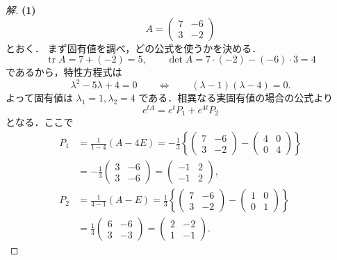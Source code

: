 \documentclass[article,paper=a4paper]{jlreq}
\begin{document}
\begin{proof}[解]
\textbf{(1)}
\[
  A=
  \begin{pmatrix}
    7 & -6\\
    3 & -2
  \end{pmatrix}
\]
とおく．
まず固有値を調べ，どの公式を使うかを決める．
\[
  \operatorname{tr}A=7+(-2)=5,
  \qquad
  \det A=7\cdot(-2)-(-6)\cdot3=4
\]
であるから，特性方程式は
\[
  \lambda^2-5\lambda+4=0
  \qquad\Longleftrightarrow\qquad
  (\lambda-1)(\lambda-4)=0.
\]
よって固有値は $\lambda_1=1,\lambda_2=4$ である．相異なる実固有値の場合の公式より
\[
  e^{tA}=e^{t}P_1+e^{4t}P_2
\]
となる．ここで
\begin{align*}
  P_1
    &=
    \frac{1}{1-4}(A-4E)
     =
    -\frac{1}{3}
    \left\{
    \begin{pmatrix}
      7 & -6\\
      3 & -2
    \end{pmatrix}
    -
    \begin{pmatrix}
      4 & 0\\
      0 & 4
    \end{pmatrix}
    \right\}\\
    &=
    -\frac{1}{3}
    \begin{pmatrix}
      3 & -6\\
      3 & -6
    \end{pmatrix}
     =
    \begin{pmatrix}
      -1 & 2\\
      -1 & 2
    \end{pmatrix},\\
  P_2
    &=
    \frac{1}{4-1}(A-E)
     =
    \frac{1}{3}
    \left\{
    \begin{pmatrix}
      7 & -6\\
      3 & -2
    \end{pmatrix}
    -
    \begin{pmatrix}
      1 & 0\\
      0 & 1
    \end{pmatrix}
    \right\}\\
    &=
    \frac{1}{3}
    \begin{pmatrix}
      6 & -6\\
      3 & -3
    \end{pmatrix}
     =
    \begin{pmatrix}
      2 & -2\\
      1 & -1
    \end{pmatrix}.
\end{align*}

\end{proof}
\end{document}
